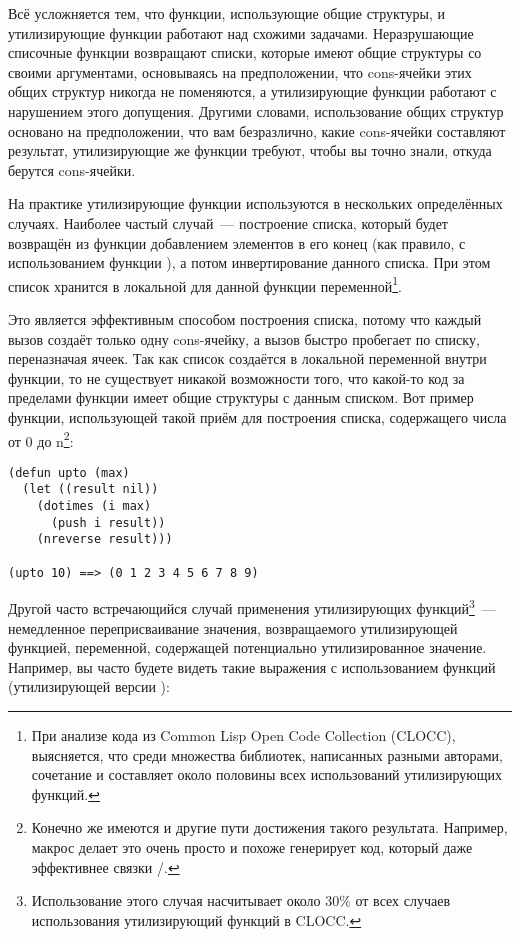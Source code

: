 Всё усложняется тем, что функции, использующие общие структуры, и утилизирующие функции
работают над схожими задачами. Неразрушающие списочные функции возвращают списки,
которые имеют общие структуры со своими аргументами, основываясь на предположении, что
cons-ячейки этих общих структур никогда не поменяются, а утилизирующие функции работают с
нарушением этого допущения. Другими словами, использование общих структур основано на
предположении, что вам безразлично, какие cons-ячейки составляют результат, утилизирующие
же функции требуют, чтобы вы точно знали, откуда берутся cons-ячейки.

На практике утилизирующие функции используются в нескольких определённых
случаях. Наиболее частый случай~--- построение списка, который будет возвращён из функции
добавлением элементов в его конец (как правило, с использованием функции ), а
потом инвертирование данного списка. При этом список хранится в локальной для данной
функции переменной\footnote{При анализе кода из Common Lisp Open Code Collection
  (CLOCC), выясняется, что среди множества библиотек, написанных разными авторами,
  сочетание  и  составляет около половины всех использований
  утилизирующих функций.}.

Это является эффективным способом построения списка, потому что каждый вызов 
создаёт только одну cons-ячейку, а вызов  быстро пробегает по списку,
переназначая  ячеек. Так как список создаётся в локальной переменной внутри
функции, то не существует никакой возможности того, что какой-то код за пределами функции имеет общие
структуры с данным списком. Вот пример функции, использующей такой приём для
построения списка, содержащего числа от 0 до n\footnote{Конечно же имеются и другие
  пути достижения такого результата. Например, макрос  делает это очень просто
  и похоже генерирует код, который даже эффективнее связки /.}:

\begin{lstlisting}
(defun upto (max)
  (let ((result nil))
    (dotimes (i max)
      (push i result))
    (nreverse result)))

(upto 10) ==> (0 1 2 3 4 5 6 7 8 9)
\end{lstlisting}

Другой часто встречающийся случай применения утилизирующих функций\footnote{Использование
  этого случая насчитывает около 30\% от всех случаев использования утилизирующий функций
  в CLOCC.}~--- немедленное переприсваивание значения, возвращаемого утилизирующей функцией,
переменной, содержащей потенциально утилизированное значение. Например, вы часто будете
видеть такие выражения с использованием функций  (утилизирующей версии
):

